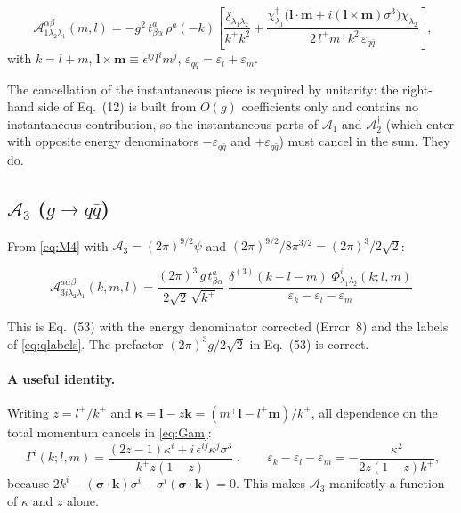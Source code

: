 \documentclass[11pt]{article}
\newcommand{\eps}{\varepsilon}
\newcommand{\dg}{\dagger}
\newcommand{\dthree}{\delta^{(3)}}
\newcommand{\Gam}{\Gamma}
\newcommand{\Ph}{\Phi}
\begin{document}
\begin{res}
\begin{equation}
\boxed{\;
\mathcal A^{\alpha\beta}_{1\lambda_2\lambda_1}(m,l)=
-g^{2}\,t^{a}_{\beta\alpha}\,\rho^{a}(-k)\left[
\frac{\delta_{\lambda_1\lambda_2}}{k^{+}k^{2}}
+\frac{\chi^{\dg}_{\lambda_1}\big(\bm l\!\cdot\!\bm m
+i(\bm l\!\times\!\bm m)\sigma^{3}\big)\chi_{\lambda_2}}
{2\,l^{+}m^{+}k^{2}\,\eps_{q\bar q}}\right],}
\label{eq:A1}
\end{equation}
with $k=l+m$, $\bm l\!\times\!\bm m\equiv\epsilon^{ij}l^{i}m^{j}$,
$\eps_{q\bar q}=\eps_{l}+\eps_{m}$.
\end{res}

\noindent
The cancellation of the instantaneous piece is required by unitarity: the right-hand side of
Eq.~(12) is built from $O(g)$ coefficients only and contains no instantaneous contribution, so
the instantaneous parts of $\mathcal A_1$ and $\mathcal A_2^{\dg}$ (which enter with opposite
energy denominators $-\eps_{q\bar q}$ and $+\eps_{q\bar q}$) must cancel in the sum. They do.

\subsection{$\mathcal A_3$ ($g\to q\bar q$)}

From \eqref{eq:M4} with $\mathcal A_{3}=(2\pi)^{9/2}\psi$ and
$(2\pi)^{9/2}/8\pi^{3/2}=(2\pi)^{3}/2\sqrt2$:
\begin{res}
\begin{equation}
\boxed{\;
\mathcal A^{a\alpha\beta}_{3i\lambda_2\lambda_1}(k,m,l)=
\frac{(2\pi)^{3}\,g\,t^{a}_{\beta\alpha}}{2\sqrt2\,\sqrt{k^{+}}}\;
\frac{\dthree(k-l-m)\;\Ph^{i}_{\lambda_1\lambda_2}(k;l,m)}
{\eps_{k}-\eps_{l}-\eps_{m}}\;}
\label{eq:A3}
\end{equation}
\end{res}
\noindent
This is Eq.~(53) with the energy denominator corrected (Error~8) and the labels of
\eqref{eq:qlabels}. The prefactor $(2\pi)^{3}g/2\sqrt2$ in Eq.~(53) is correct.

\paragraph{A useful identity.} Writing $z=l^{+}/k^{+}$ and
$\bm\kappa=\bm l-z\bm k=(m^{+}\bm l-l^{+}\bm m)/k^{+}$, all dependence on the total momentum
cancels in \eqref{eq:Gam}:
\begin{equation}
\boxed{\;\Gam^{i}(k;l,m)=\frac{(2z-1)\kappa^{i}+i\,\epsilon^{ij}\kappa^{j}\sigma^{3}}{k^{+}z(1-z)}\;},
\qquad
\eps_{k}-\eps_{l}-\eps_{m}=-\frac{\kappa^{2}}{2z(1-z)k^{+}},
\label{eq:kappa}
\end{equation}
because $2k^{i}-(\bm\sigma\!\cdot\!\bm k)\sigma^{i}-\sigma^{i}(\bm\sigma\!\cdot\!\bm k)=0$.
This makes $\mathcal A_3$ manifestly a function of $\kappa$ and $z$ alone.
\end{document}
